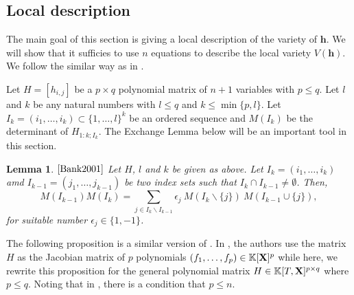 \documentclass[11pt]{article}
\numberwithin{Property}{section}
\numberwithin{Theorem}{section}
\numberwithin{Proposition}{section}
\newtheorem{Lemma}{Lemma}%
\numberwithin{Lemma}{section}
\numberwithin{Corollary}{section}
\numberwithin{Definition}{section}
\numberwithin{Remark}{section}
\numberwithin{Conjecture}{section}
\numberwithin{Problem}{section}
\numberwithin{Claim}{section}
\theoremstyle{definition}
\numberwithin{Example}{section}
\def\h {\ensuremath{\mathbf{h}}}
\renewcommand{\leq}{\leqslant}
\newcommand{\field}{\mathbb{K}} %
\newcommand{\mat}[1]{\mathbf{\MakeUppercase{#1}}} %
\begin{document}
\subsection{Local description}
\label{subsec:local}
The main goal of this section is giving a local description of the variety of $\h$. We will show that it sufficies to use $n$ equations to describe the local variety $V(\h)$. We follow the similar way as in \cite[Section ~ 2.2]{Bank2001}. 

Let $H = [h_{i,j}]$ be a $p \times q$ polynomial matrix of $n+1$ variables with $p \leq q$. Let $l$ and $k$ be any natural numbers with $l \leq q$ and $k \leq \min\{p,l\}$. Let $I_k = (i_1, \ldots, i_k) \subset \{1, \ldots, l\}^k$ be an ordered sequence and $M(I_k)$ be the determinant of $H_{1:k;I_k}$. The Exchange Lemma below will be an important tool in this section. 
\begin{Lemma}$\cite{Bank2001}$ Let $H$, $l$ and $k$ be given as above. Let $I_k = (i_1, \ldots, i_k)$ amd $I_{k-1} = (j_1, \ldots, j_{k-1})$ be two index sets such that $I_k \cap I_{k-1} \ne \emptyset$. Then, 
\[
M({I_{k-1}})M(I_k) = \sum_{j \in I_k \backslash I_{k-1}} \epsilon_j \ M(I_k \backslash \{j\}) \ M(I_{k-1} \cup \{j\}), 
\] for suitable number $\epsilon_j \in \{1, -1\}$. \label{exchange}
\end{Lemma}
The following proposition is a similar version of \cite[Proposition ~ 5]{Bank2001}. In \cite{Bank2001}, the authors use the matrix $H$ as the Jacobian matrix of $p$ polynomials $(f_1, \ldots, f_p) \in \field[\mat{X}]^p$ while here, we rewrite this proposition for the general polynomial matrix $H \in \field[T,\mat{X}]^{p \times q}$ where $p \leq q$. Noting that in \cite{Bank2001}, there is a condition that $p \leq n$. 
\end{document}
